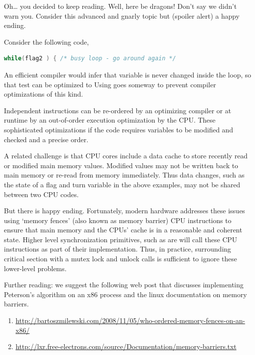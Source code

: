 Oh\ldots{} you decided to keep reading. Well, here be dragons! Don't say we didn't warn you. Consider this advanced and gnarly topic but (spoiler alert) a happy ending.

Consider the following code,

\begin{lstlisting}[language=C]
while(flag2 ) { /* busy loop - go around again */
\end{lstlisting}

An efficient compiler would infer that  variable is never changed inside the loop, so that test can be optimized to  Using  goes someway to prevent compiler optimizations of this kind.

Independent instructions can be re-ordered by an optimizing compiler or at runtime by an out-of-order execution optimization by the CPU. These sophisticated optimizations if the code requires variables to be modified and checked and a precise order.

A related challenge is that CPU cores include a data cache to store recently read or modified main memory values. Modified values may not be written back to main memory or re-read from memory immediately. Thus data changes, such as the state of a flag and turn variable in the above examples, may not be shared between two CPU codes.

But there is happy ending. Fortunately, modern hardware addresses these issues using `memory fences' (also known as memory barrier) CPU instructions to ensure that main memory and the CPUs' cache is in a reasonable and coherent state. Higher level synchronization primitives, such as  are will call these CPU instructions as part of their implementation. Thus, in practice, surrounding critical section with a mutex lock and unlock calls is sufficient to ignore these lower-level problems.

Further reading: we suggest the following web post that discusses implementing Peterson's algorithm on an x86 process and the linux documentation on memory barriers.
\begin{enumerate}
\item \href{Memory Fences}{http://bartoszmilewski.com/2008/11/05/who-ordered-memory-fences-on-an-x86/}
\item \href{Memory Barriers}{http://lxr.free-electrons.com/source/Documentation/memory-barriers.txt}
\end{enumerate}


